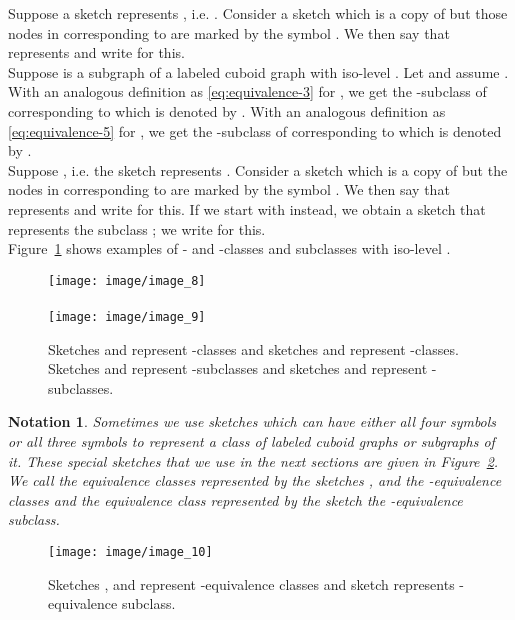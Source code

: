 \documentclass[a4paper,11pt]{article}
\newtheorem{notation}{Notation}
\begin{document}
Suppose a sketch  represents
, i.e. . Consider a sketch
 which is a copy of  but those nodes in  corresponding to 
are marked by the symbol . We then say that  represents
 and write  for this. \\

Suppose 
is a subgraph of a labeled cuboid graph  with iso-level . Let 
and assume . With an analogous definition as \eqref{eq:equivalence-3}
for , we get the  -subclass of  corresponding
to  which is denoted by . With an analogous
definition as \eqref{eq:equivalence-5} for , we get the  -subclass of
 corresponding to  which is denoted by
.\\

Suppose
, i.e. the sketch  represents .
Consider a sketch  which is a copy of  but the nodes in  corresponding to
 are marked by the symbol . We then say that  represents
 and write  for this. If we start
with  instead, we obtain a sketch  that represents
the subclass ; we write  for this.\\

\noindent Figure~\ref{image_8_9} shows examples of - and
-classes and subclasses with iso-level .
\begin{figure}[!ht]
\texttt{[image: image/image\_8]}\\ \\
\texttt{[image: image/image\_9]}
\caption{Sketches  and  represent -classes and sketches  and  represent
-classes. Sketches  and  represent -subclasses and
sketches  and  represent -subclasses.}
\label{image_8_9}
\end{figure}
\FloatBarrier

\begin{notation}
Sometimes we use sketches which can have either all four symbols  or
all three symbols  to represent a class of labeled cuboid graphs or subgraphs of it.
These special sketches that we use in the next sections are given in Figure~\ref{image_10}. We
call the equivalence classes represented by the sketches ,  and  the -equivalence classes
and the equivalence class represented by the sketch  the -equivalence subclass.
\label{not:special}
\end{notation}
\begin{figure}[!ht]
\texttt{[image: image/image\_10]}
\caption{Sketches ,  and  represent -equivalence classes and sketch
 represents -equivalence subclass.}
\label{image_10}
\end{figure}
\end{document}
